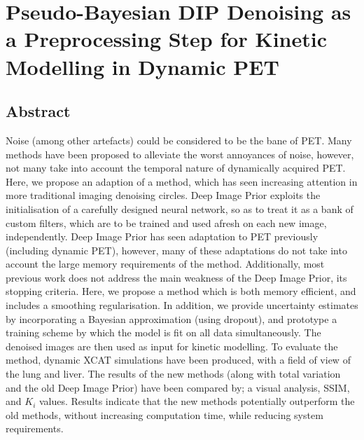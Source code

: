     \chapter{Pseudo-Bayesian DIP Denoising as a Preprocessing Step for Kinetic Modelling in Dynamic PET} \label{sec:pseudo_bayesian_dip_denoising_as_a_preprocessing_step_for_kinetic_modelling_in_dynamic_pet}
        \newpage

        \section{Abstract} \label{sec:pseudo_bayesian_dip_denoising_as_a_preprocessing_step_for_kinetic_modelling_in_dynamic_pet_appendix_abstract}
            Noise (among other artefacts) could be considered to be the bane of PET. %
            Many methods have been proposed to alleviate the worst annoyances of noise, however, not many take into account the temporal nature of dynamically acquired PET. Here, we propose an adaption of a method, which has seen increasing attention in more traditional imaging denoising circles. Deep Image Prior exploits the initialisation of a carefully designed neural network, so as to treat it as a bank of custom filters, which are to be trained and used afresh on each new image, independently. Deep Image Prior has seen adaptation to PET previously (including dynamic PET), however, many of these adaptations do not take into account the large memory requirements of the method. Additionally, most previous work does not address the main weakness of the Deep Image Prior, its stopping criteria. Here, we propose a method which is both memory efficient, and includes a smoothing regularisation. In addition, we provide uncertainty estimates by incorporating a Bayesian approximation (using dropout), and prototype a training scheme by which the model is fit on all data simultaneously. The denoised images are then used as input for kinetic modelling. To evaluate the method, dynamic XCAT simulations have been produced, with a field of view of the lung and liver. The results of the new methods (along with total variation and the old Deep Image Prior) have been compared by; a visual analysis, SSIM, and $K_i$ values. Results indicate that the new methods potentially outperform the old methods, without increasing computation time, while reducing system requirements.
    
